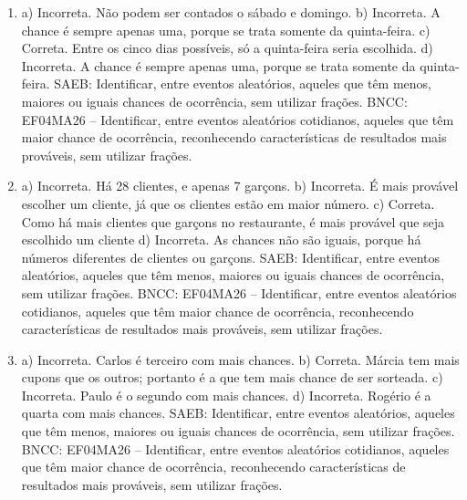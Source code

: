 \begin{enumerate}
\item
a) Incorreta. Não podem ser contados o sábado e domingo.
b) Incorreta. A chance é sempre apenas uma, porque se trata somente da quinta-feira.
c) Correta. Entre os cinco dias possíveis, só a quinta-feira seria escolhida.
d) Incorreta. A chance é sempre apenas uma, porque se trata somente da quinta-feira.
SAEB: Identificar, entre eventos aleatórios, aqueles que têm menos, maiores ou iguais chances de ocorrência, sem utilizar frações.
BNCC: EF04MA26 -- Identificar, entre eventos aleatórios cotidianos, aqueles que têm maior chance de
ocorrência, reconhecendo características de resultados mais prováveis, sem utilizar frações.

\item
a) Incorreta. Há 28 clientes, e apenas 7 garçons.
b) Incorreta. É mais provável escolher um cliente, já que os clientes estão em maior número.
c) Correta. Como há mais clientes que garçons no restaurante, é mais provável que seja escolhido um cliente
d) Incorreta. As chances não são iguais, porque há números diferentes de clientes ou garçons.
SAEB: Identificar, entre eventos aleatórios, aqueles que têm menos, maiores ou iguais chances de ocorrência, sem utilizar frações.
BNCC: EF04MA26 -- Identificar, entre eventos aleatórios cotidianos, aqueles que têm maior chance de
ocorrência, reconhecendo características de resultados mais prováveis, sem utilizar frações.

\item
a) Incorreta. Carlos é terceiro com mais chances.
b) Correta. Márcia tem mais cupons que os outros; portanto é a que tem mais chance de ser sorteada.
c) Incorreta. Paulo é o segundo com mais chances.
d) Incorreta. Rogério é a quarta com mais chances.
SAEB: Identificar, entre eventos aleatórios, aqueles que têm menos, maiores ou iguais chances de ocorrência, sem utilizar frações.
BNCC: EF04MA26 -- Identificar, entre eventos aleatórios cotidianos, aqueles que têm maior chance de
ocorrência, reconhecendo características de resultados mais prováveis, sem utilizar frações.
\end{enumerate}


